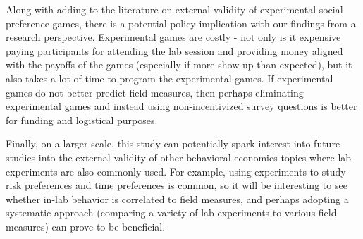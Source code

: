 \documentclass{article}
\begin{document}
Along with adding to the literature on external validity of experimental social preference games, there is a potential policy implication with our findings from a research perspective. Experimental games are costly - not only is it expensive paying participants for attending the lab session and providing money aligned with the payoffs of the games (especially if more show up than expected), but it also takes a lot of time to program the experimental games. If experimental games do not better predict field measures, then perhaps eliminating experimental games and instead using non-incentivized survey questions is better for funding and logistical purposes. 

Finally, on a larger scale, this study can potentially spark interest into future studies into the external validity of other behavioral economics topics where lab experiments are also commonly used. For example, using experiments to study risk preferences and time preferences is common, so it will be interesting to see whether in-lab behavior is correlated to field measures, and perhaps adopting a systematic approach (comparing a variety of lab experiments to various field measures) can prove to be beneficial.
 \newpage
\end{document}
